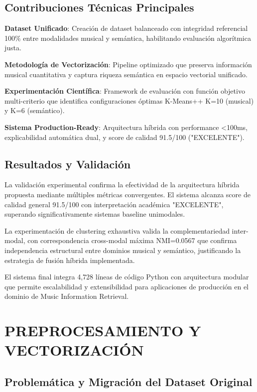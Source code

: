\documentclass[12pt,a4paper]{report}
\begin{document}
\section*{Contribuciones Técnicas Principales}

\textbf{Dataset Unificado}: Creación de dataset balanceado con integridad referencial 100\% entre modalidades musical y semántica, habilitando evaluación algorítmica justa.

\textbf{Metodología de Vectorización}: Pipeline optimizado que preserva información musical cuantitativa y captura riqueza semántica en espacio vectorial unificado.

\textbf{Experimentación Científica}: Framework de evaluación con función objetivo multi-criterio que identifica configuraciones óptimas K-Means++ K=10 (musical) y K=6 (semántico).

\textbf{Sistema Production-Ready}: Arquitectura híbrida con performance <100ms, explicabilidad automática dual, y score de calidad 91.5/100 ("EXCELENTE").

\section*{Resultados y Validación}

La validación experimental confirma la efectividad de la arquitectura híbrida propuesta mediante múltiples métricas convergentes. El sistema alcanza score de calidad general 91.5/100 con interpretación académica "EXCELENTE", superando significativamente sistemas baseline unimodales.

La experimentación de clustering exhaustiva valida la complementariedad inter-modal, con correspondencia cross-modal máxima NMI=0.0567 que confirma independencia estructural entre dominios musical y semántico, justificando la estrategia de fusión híbrida implementada.

El sistema final integra 4,728 líneas de código Python con arquitectura modular que permite escalabilidad y extensibilidad para aplicaciones de producción en el dominio de Music Information Retrieval.

\tableofcontents

\chapter{PREPROCESAMIENTO Y VECTORIZACIÓN}

\section{Problemática y Migración del Dataset Original}
\end{document}

